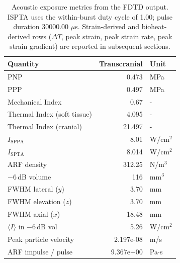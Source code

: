 \documentclass[11pt,letterpaper]{article}
\begin{document}
\begin{table}[h!]
\centering
\scriptsize
\setlength{\tabcolsep}{6pt}
\renewcommand{\arraystretch}{1.05}


\begin{tabular}{l r  l}
\toprule
\textbf{Quantity} & \textbf{Transcranial}  & \textbf{Unit} \\
\midrule
PNP                                  & 0.473        & MPa \\
PPP                                  & 0.497        & MPa \\
Mechanical Index                     & 0.67             & - \\
Thermal Index (soft tissue)          & 4.095        & - \\
Thermal Index (cranial)              & 21.497     & - \\
$I_{\mathrm{SPPA}}$                  & 8.01    & W/cm$^2$ \\
$I_{\mathrm{SPTA}}$                  & 8.014    & W/cm$^2$ \\
ARF density                          & 312.25   & N/m$^3$ \\
$-6$\,dB volume                      & 116 & mm$^3$ \\
FWHM lateral ($y$)                   & 3.70      & mm \\
FWHM elevation ($z$)                 & 3.70      & mm \\
FWHM axial ($x$)                     & 18.48      & mm \\
$\langle I \rangle$ in $-6$\,dB vol  & 5.26   & W/cm$^2$ \\
Peak particle velocity               & 2.197e-08 & m/s \\
ARF impulse / pulse                  & 9.367e+00 & Pa$\cdot$s \\
\bottomrule
\end{tabular}
\caption{Acoustic exposure metrics from the FDTD output.  ISPTA uses the within-burst duty cycle of 1.00; pulse duration 30000.00 $\mu$s.  Strain-derived and bioheat-derived rows ($\Delta T$, peak strain, peak strain rate, peak strain gradient) are reported in subsequent sections.}
\label{tab:acoustic_outputs}
\end{table}
\end{document}
